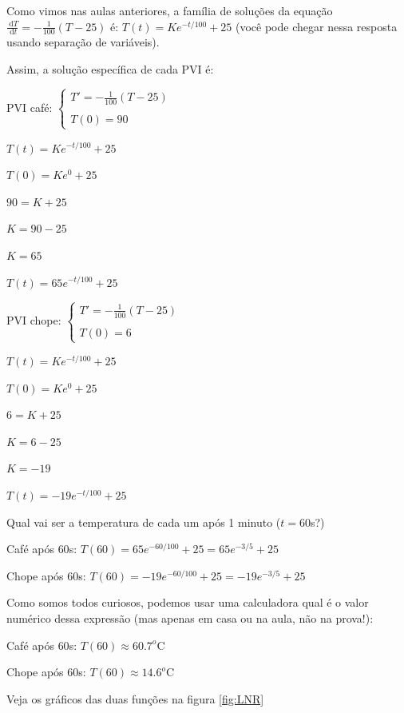 \documentclass[a4paper]{article}
\newcommand{\ud}{\mathrm{\ d}}
\begin{document}
Como vimos nas aulas anteriores, a família de soluções da equação
$\frac{\ud T}{\ud t}=-\frac{1}{100}(T-25)$ é: $T(t)=Ke^{-t/100}+25$
(você pode chegar nessa resposta usando separação de variáveis).

Assim, a solução específica de cada PVI é:

\begin{multicols}{2}
PVI café:  $\left\{
    \begin{array}{l}
      T'=-\frac{1}{100}(T-25)\\
      \\
      T(0)=90
    \end{array}
  \right.$

$T(t)=Ke^{-t/100}+25$

$T(0)=Ke^{0}+25$

$90=K+25$

$K= 90 - 25$

$K=65$

$T(t)=65e^{-t/100}+25$

\columnbreak

PVI chope:  $\left\{
    \begin{array}{l}
      T'=-\frac{1}{100}(T-25)\\
      \\
      T(0)=6
    \end{array}
  \right.$

$T(t)=Ke^{-t/100}+25$

$T(0)=Ke^{0}+25$

$6=K+25$

$K= 6 - 25$

$K=-19$

$T(t)=-19e^{-t/100}+25$

\end{multicols}

Qual vai ser a temperatura de cada um após 1 minuto ($t=60$s?)

Café após $60$s: $T(60)=65e^{-60/100}+25 = 65e^{-3/5}+25$

Chope após $60$s: $T(60)=-19e^{-60/100}+25 = -19e^{-3/5}+25$

Como somos todos curiosos, podemos usar uma calculadora qual é o valor numérico dessa
expressão (mas apenas em casa ou na aula, não na prova!):

Café após $60$s: $T(60)\approx 60.7^o$C

Chope após $60$s: $T(60)\approx 14.6^o$C

Veja os gráficos das duas funções na figura \ref{fig:LNR}
\end{document}
